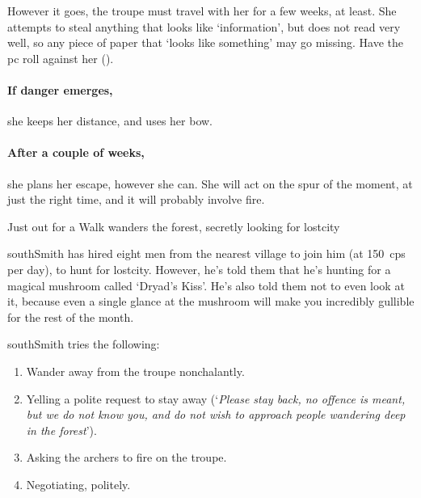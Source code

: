 However it goes, the troupe must travel with her for a few weeks, at least.
She attempts to steal anything that looks like `information', but does not read very well, so any piece of paper that `looks like something' may go missing.
Have the \gls{pc} roll  against her  (\tn).

\paragraph{If danger emerges,}
she keeps her distance, and uses her bow.

\paragraph{After a couple of weeks,}
she plans her escape, however she can.
She will act on the spur of the moment, at just the right time, and it will probably involve fire.

\southRogue
\label{southRogue}

{Just out for a Walk}%
{ wanders the forest, secretly looking for \gls{lostcity}}%

\Gls{southSmith} has hired eight men from the nearest \gls{village} to join him (at 150~\glspl{cp} per day), to hunt for \gls{lostcity}.
However, he's told them that he's hunting for a magical mushroom called `Dryad's Kiss'.%
He's also told them not to even look at it, because even a single glance at the mushroom will make you incredibly gullible for the rest of the month.

\renewcommand\npcQuote{You don't need to trust us to speak politely.  Can we start again?}

\Gls{southSmith} tries the following:

\begin{enumerate}
  \item
  Wander away from the troupe nonchalantly.
  \item
  Yelling a polite request to stay away (`\textit{Please stay back, no offence is meant, but we do not know you, and do not wish to approach people wandering deep in the forest}').
  \item
  Asking the archers to fire on the troupe.
  \item
  Negotiating, politely.
\end{enumerate}


